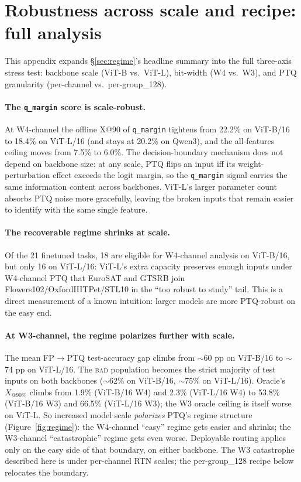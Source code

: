 \documentclass{article}
\makeatletter
\newcommand{\fp}{\textsc{FP}\xspace}
\newcommand{\ptq}{\textsc{PTQ}\xspace}
\newcommand{\bad}{\textsc{bad}\xspace}
\newcommand{\xat}[1]{\ensuremath{X_{@#1\%}}}
\makeatother
\begin{document}
\section{Robustness across scale and recipe: full analysis}\label{app:regime}
\label{sec:ablation_recipe}

This appendix expands \S\ref{sec:regime}'s headline summary into the full three-axis stress test: backbone scale (ViT-B vs.\ ViT-L), bit-width (W4 vs.\ W3), and PTQ granularity (per-channel vs.\ per-group\_128).

\paragraph{The \texttt{q\_margin} score is scale-robust.} At W4-channel the offline X@90 of \texttt{q\_margin} tightens from 22.2\% on ViT-B/16 to 18.4\% on ViT-L/16 (and stays at 20.2\% on Qwen3), and the all-features ceiling moves from 7.5\% to 6.0\%. The decision-boundary mechanism does not depend on backbone size: at any scale, PTQ flips an input iff its weight-perturbation effect exceeds the logit margin, so the \texttt{q\_margin} signal carries the same information content across backbones. ViT-L's larger parameter count absorbs \ptq{} noise more gracefully, leaving the broken inputs that remain easier to identify with the same single feature.

\paragraph{The recoverable regime shrinks at scale.} Of the 21 finetuned tasks, 18 are eligible for W4-channel analysis on ViT-B/16, but only 16 on ViT-L/16: ViT-L's extra capacity preserves enough inputs under W4-channel \ptq{} that EuroSAT and GTSRB join Flowers102/OxfordIIITPet/STL10 in the ``too robust to study'' tail. This is a direct measurement of a known intuition: larger models are more \ptq-robust on the easy end.

\paragraph{At W3-channel, the regime polarizes further with scale.} The mean \fp$\to$\ptq test-accuracy gap climbs from $\sim$60 pp on ViT-B/16 to $\sim$74 pp on ViT-L/16. The \bad{} population becomes the strict majority of test inputs on both backbones ($\sim$62\% on ViT-B/16, $\sim$75\% on ViT-L/16). Oracle's \xat{90} climbs from 1.9\% (ViT-B/16 W4) and 2.3\% (ViT-L/16 W4) to 53.8\% (ViT-B/16 W3) and 66.5\% (ViT-L/16 W3); the W3 oracle ceiling is itself worse on ViT-L. So increased model scale \emph{polarizes} \ptq{}'s regime structure (Figure~\ref{fig:regime}): the W4-channel ``easy'' regime gets easier and shrinks; the W3-channel ``catastrophic'' regime gets even worse. Deployable routing applies only on the easy side of that boundary, on either backbone. The W3 catastrophe described here is under per-channel RTN scales; the per-group\_128 recipe below relocates the boundary.
\end{document}
